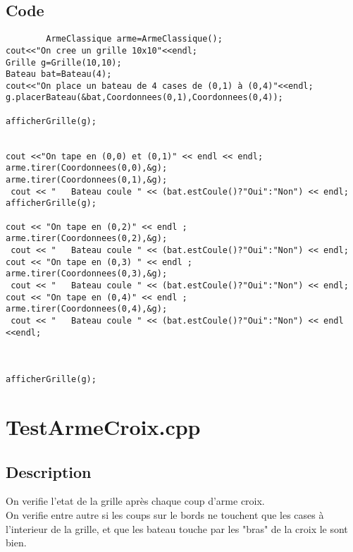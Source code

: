         \subsection{Code}
	\begin{lstlisting}
		ArmeClassique arme=ArmeClassique();
cout<<"On cree un grille 10x10"<<endl;
Grille g=Grille(10,10);
Bateau bat=Bateau(4);
cout<<"On place un bateau de 4 cases de (0,1) à (0,4)"<<endl;
g.placerBateau(&bat,Coordonnees(0,1),Coordonnees(0,4));
	
afficherGrille(g);	


cout <<"On tape en (0,0) et (0,1)" << endl << endl; 
arme.tirer(Coordonnees(0,0),&g);
arme.tirer(Coordonnees(0,1),&g);
 cout << "   Bateau coule " << (bat.estCoule()?"Oui":"Non") << endl;
afficherGrille(g);

cout << "On tape en (0,2)" << endl ; 
arme.tirer(Coordonnees(0,2),&g);
 cout << "   Bateau coule " << (bat.estCoule()?"Oui":"Non") << endl;
cout << "On tape en (0,3) " << endl ; 
arme.tirer(Coordonnees(0,3),&g);
 cout << "   Bateau coule " << (bat.estCoule()?"Oui":"Non") << endl;
cout << "On tape en (0,4)" << endl ; 
arme.tirer(Coordonnees(0,4),&g);
 cout << "   Bateau coule " << (bat.estCoule()?"Oui":"Non") << endl <<endl;



afficherGrille(g);
	\end{lstlisting}
    \section{TestArmeCroix.cpp}
        \subsection{Description}
            On verifie l'etat de la grille après chaque coup d'arme croix.\\
            On verifie entre autre si les coups sur le bords ne touchent que les cases à l'interieur de la grille, et que les bateau touche par les "bras" de la croix le sont bien.
